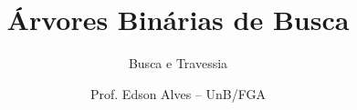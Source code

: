 \title{Árvores Binárias de Busca}
\subtitle{Busca e Travessia}
\author{Prof. Edson Alves -- UnB/FGA}
\date{}
